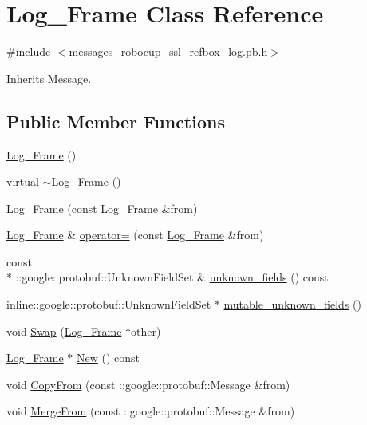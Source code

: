 \hypertarget{class_log___frame}{\section{Log\-\_\-\-Frame Class Reference}
\label{class_log___frame}
}


{\ttfamily \#include $<$messages\-\_\-robocup\-\_\-ssl\-\_\-refbox\-\_\-log.\-pb.\-h$>$}



Inherits Message.

\subsection*{Public Member Functions}
\begin{DoxyCompactItemize}
\item 
\hyperlink{class_log___frame_aa8fce540e3a7bec9bb4895c2339a2d31}{Log\-\_\-\-Frame} ()
\item 
virtual \hyperlink{class_log___frame_a76c5503a55a6f31e106ed5e1669808cf}{$\sim$\-Log\-\_\-\-Frame} ()
\item 
\hyperlink{class_log___frame_a3c709f45294dbd781be94fbe9205f91d}{Log\-\_\-\-Frame} (const \hyperlink{class_log___frame}{Log\-\_\-\-Frame} \&from)
\item 
\hyperlink{class_log___frame}{Log\-\_\-\-Frame} \& \hyperlink{class_log___frame_a96901a3cf35d948200885953cb1001eb}{operator=} (const \hyperlink{class_log___frame}{Log\-\_\-\-Frame} \&from)
\item 
const \\*
\-::google\-::protobuf\-::\-Unknown\-Field\-Set \& \hyperlink{class_log___frame_a7b67f3f73090ec6d3a912824ef645eeb}{unknown\-\_\-fields} () const 
\item 
inline\-::google\-::protobuf\-::\-Unknown\-Field\-Set $\ast$ \hyperlink{class_log___frame_a3dc34351ac9c00aaffba19a4c4e131d4}{mutable\-\_\-unknown\-\_\-fields} ()
\item 
void \hyperlink{class_log___frame_aad127488b2ffc3356560277ddb08e04c}{Swap} (\hyperlink{class_log___frame}{Log\-\_\-\-Frame} $\ast$other)
\item 
\hyperlink{class_log___frame}{Log\-\_\-\-Frame} $\ast$ \hyperlink{class_log___frame_ad9fba5c184c766198d2802ea876239ce}{New} () const 
\item 
void \hyperlink{class_log___frame_a15ccd3a383732c423270229f63ab17b7}{Copy\-From} (const \-::google\-::protobuf\-::\-Message \&from)
\item 
void \hyperlink{class_log___frame_a8ba5c6305355bb73ec20b824c6624768}{Merge\-From} (const \-::google\-::protobuf\-::\-Message \&from)

\end{DoxyCompactItemize}
